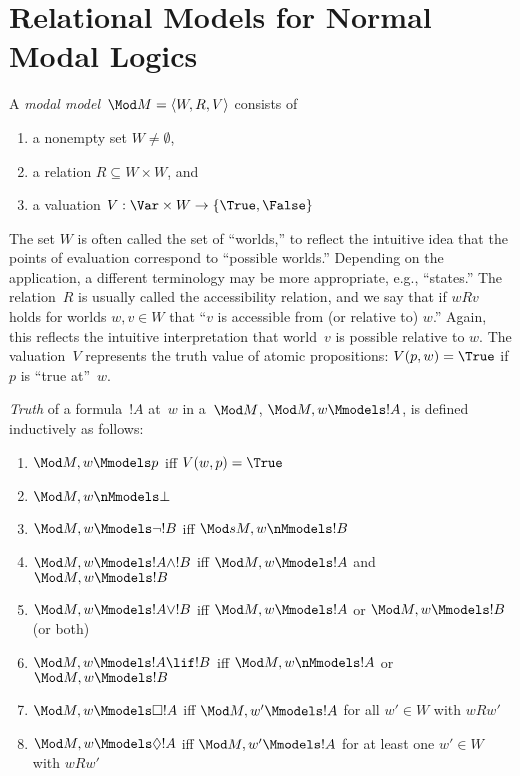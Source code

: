 \documentclass[modal-logic]{subfiles}
\begin{document}
\section{Relational Models for Normal Modal Logics}

\begin{defn}
A \emph{modal model}~$\Mod M = \langle W, R, V\rangle$ consists of
\begin{enumerate}
\item a nonempty set $ W\neq \emptyset$,
\item a relation $R \subseteq W \times W$, and
\item a valuation $V: \Var \times W \to \{\True, \False\}$
\end{enumerate}
\end{defn}

The set $W$ is often called the set of ``worlds,'' to reflect the
intuitive idea that the points of evaluation correspond to ``possible
worlds.'' Depending on the application, a different terminology may be
more appropriate, e.g., ``states.''  The relation~$R$ is usually
called the accessibility relation, and we say that if $wRv$ holds for
worlds $w, v \in W$ that ``$v$ is accessible from (or relative to)
$w$.''  Again, this reflects the intuitive interpretation that
world~$v$ is possible relative to $w$.  The valuation~$V$
represents the truth value of atomic propositions: $V(p, w) = \True$
if $p$ is ``true at''~$w$.

\begin{defn}\label{defn:mmodels}
\emph{Truth} of a formula~$!A$  at~$w$ in a~$\Mod M$, $\Mod M, w
\Mmodels !A$, is defined inductively as follows:
\begin{enumerate}
\item $\Mod M, w \Mmodels p$ iff $V(w, p) = \True$
\item $\Mod M, w \nMmodels \bot$ 
\item $\Mod M, w \Mmodels \lnot !B$ iff $\Mod s M, w \nMmodels !B$
\item $\Mod M, w \Mmodels !A \land !B$ iff $\Mod M, w \Mmodels !A$ and
  $\Mod M, w \Mmodels !B$
\item $\Mod M, w \Mmodels !A \lor !B$ iff $\Mod M, w \Mmodels !A$ or
  $\Mod M, w \Mmodels !B$ (or both)
\item $\Mod M, w \Mmodels !A \lif !B$ iff $\Mod M, w \nMmodels !A$ or
  $\Mod M, w \Mmodels !B$
\item\label{defn:sub:mmodels-box} $\Mod M, w \Mmodels \Box !A$ iff $\Mod M, w'
  \Mmodels !A$ for all $w' \in W$ with $wRw'$
\item $\Mod M, w \Mmodels \Diamond !A$ iff $\Mod M, w' \Mmodels !A$ for
  at least one $w' \in W$ with $wRw'$
\end{enumerate} 
\end{defn}
\end{document}
